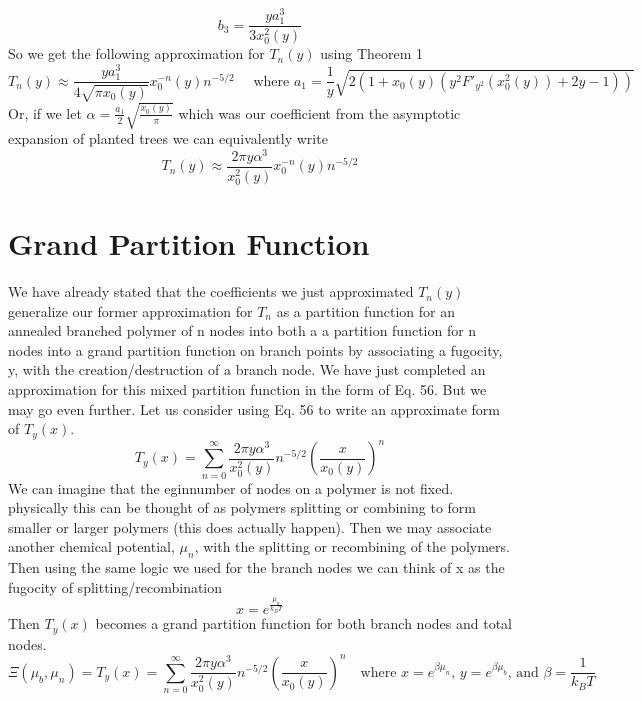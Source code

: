 \documentclass{article}
\begin{document}
\begin{equation}
b_3=\frac{ya_1^3}{3x_0^2(y)}
\end{equation}
So we get the following approximation for \(T_n(y)\) using Theorem 1
\begin{equation}
T_n(y) \approx \frac{ya_1^3}{4\sqrt{\pi x_0(y)}}x_0^{-n}(y)n^{-5/2} \quad \text{ where }a_1=\frac{1}{y}\sqrt{2(1+x_0(y)(y^2F'_{y^2}(x_0^2(y))+2y-1))}
\end{equation}
Or, if we let \(\alpha = \frac{a_1}{2}\sqrt{\frac{x_0(y)}{\pi}}\) which was our coefficient from the asymptotic expansion of planted trees we can equivalently write
\begin{equation}
T_n(y) \approx \frac{2\pi y \alpha^3}{x_0^2(y)}x_0^{-n}(y)n^{-5/2}
\end{equation}

\section{Grand Partition Function}
We have already stated that the coefficients we just approximated \(T_n(y)\) generalize our former approximation for \(T_n\) as a partition function for an annealed branched polymer of n nodes into both a a partition function for n nodes into a grand partition function on branch points by associating a fugocity, y, with the creation/destruction of a branch node. We have just completed an approximation for this mixed partition function in the form of Eq. 56. But we may go even further. Let us consider using Eq. 56 to write an approximate form of \(T_y(x)\).
\begin{equation}
T_y(x)=\sum_{n=0}^\infty  \frac{2\pi y \alpha^3}{x_0^2(y)}n^{-5/2} \left(\frac{x}{x_0(y)}\right)^n
\end{equation}
We can imagine that the eginnumber of nodes on a polymer is not fixed. physically this can be thought of as polymers splitting or combining to form smaller or larger polymers (this does actually happen). Then we may associate another chemical potential, \(\mu_n\), with the splitting or recombining of the polymers. Then using the same logic we used for the branch nodes we can think of x as the fugocity of splitting/recombination
\begin{equation}
x=e^{\frac{\mu_n}{k_BT}}
\end{equation}
Then \(T_y(x)\) becomes a grand partition function for both branch nodes and total nodes.
\begin{equation}
\Xi(\mu_b,\mu_n)=T_y(x)=\sum_{n=0}^\infty  \frac{2\pi y \alpha^3}{x_0^2(y)}n^{-5/2} \left(\frac{x}{x_0(y)}\right)^n \quad \text{where } x=e^{\beta \mu_n}\text{, } y=e^{\beta \mu_b}\text{, and  } \beta=\frac{1}{k_BT}
\end{equation}
\end{document}
